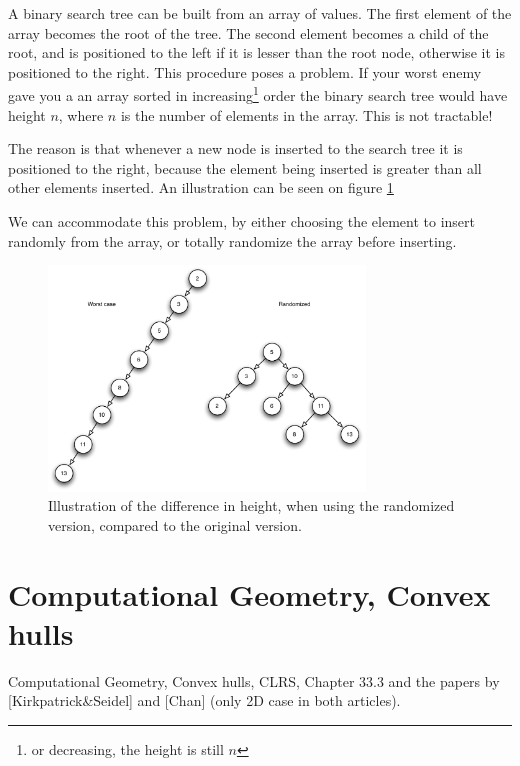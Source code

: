 \documentclass[10pt]{article}
\begin{document}
A binary search tree can be built from an array of values. The first element of the array becomes the root of the tree. The second element becomes a child of the root, and is positioned to the left if it is lesser than the root node, otherwise it is positioned to the right. This procedure poses a problem. If your worst enemy gave you a an array sorted in increasing\footnote{or decreasing, the height is still $n$} order the binary search tree would have height $n$, where $n$ is the number of elements in the array. This is not tractable! 

The reason is that whenever a new node is inserted to the search tree it is positioned to the right, because the element being inserted is greater than all other elements inserted. An illustration can be seen on figure \ref{fig11}

We can accommodate this problem, by either choosing the element to insert randomly from the array, or totally randomize the array before inserting.

\begin{figure}[ht]
\centering
\includegraphics[width=0.75\textwidth]{figures/fig11.pdf}
\caption{Illustration of the difference in height, when using the randomized version, compared to the original version.}
\label{fig11}
\end{figure}



\clearpage \newpage
\section{Computational Geometry, Convex hulls} %
\label{sec:computational_geometry_convex_hulls}
Computational Geometry, Convex  hulls, CLRS,  Chapter 33.3 and the papers by [Kirkpatrick\&Seidel] and [Chan] (only 2D case in both articles).
\end{document}
